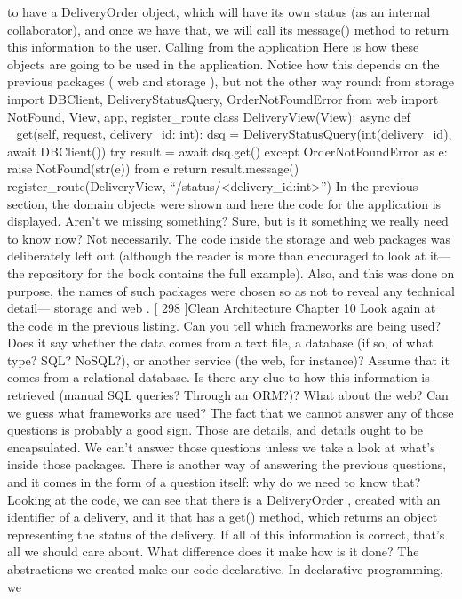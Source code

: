 \documentclass[a4paper,10pt,english]{sphinxmanual}
\begin{document}
to have a DeliveryOrder object, which will have its own status (as an internal
collaborator), and once we have that, we will call its message() method to return this
information to the user.
Calling from the application
Here is how these objects are going to be used in the application. Notice how this depends
on the previous packages ( web and storage ), but not the other way round:
from storage import DBClient, DeliveryStatusQuery, OrderNotFoundError
from web import NotFound, View, app, register\_route
class DeliveryView(View):
async def \_get(self, request, delivery\_id: int):
dsq = DeliveryStatusQuery(int(delivery\_id), await DBClient())
try
result = await dsq.get()
except OrderNotFoundError as e:
raise NotFound(str(e)) from e
return result.message()
register\_route(DeliveryView, “/status/\textless{}delivery\_id:int\textgreater{}”)
In the previous section, the domain objects were shown and here the code for the
application is displayed. Aren’t we missing something? Sure, but is it something we really
need to know now? Not necessarily.
The code inside the storage and web packages was deliberately left out (although the
reader is more than encouraged to look at it—the repository for the book contains the full
example). Also, and this was done on purpose, the names of such packages were chosen so
as not to reveal any technical detail— storage and web .
{[} 298 {]}Clean Architecture
Chapter 10
Look again at the code in the previous listing. Can you tell which frameworks are being
used? Does it say whether the data comes from a text file, a database (if so, of what type?
SQL? NoSQL?), or another service (the web, for instance)? Assume that it comes from a
relational database. Is there any clue to how this information is retrieved (manual SQL
queries? Through an ORM?)?
What about the web? Can we guess what frameworks are used?
The fact that we cannot answer any of those questions is probably a good sign. Those are
details, and details ought to be encapsulated. We can’t answer those questions unless we
take a look at what’s inside those packages.
There is another way of answering the previous questions, and it comes in the form of a
question itself: why do we need to know that? Looking at the code, we can see that there is
a DeliveryOrder , created with an identifier of a delivery, and it that has a get() method,
which returns an object representing the status of the delivery. If all of this information is
correct, that’s all we should care about. What difference does it make how is it done?
The abstractions we created make our code declarative. In declarative programming, we
\end{document}

